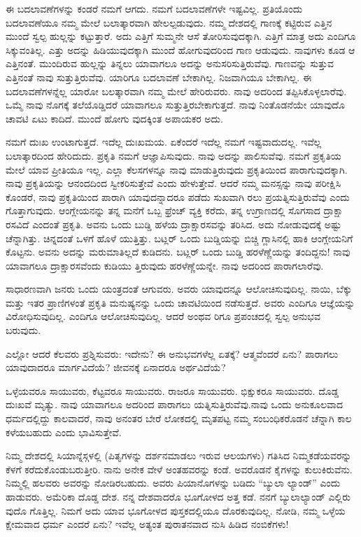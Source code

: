 ಈ ಬದಲಾವಣೆಗಳನ್ನು ಕಂಡರೆ ನಮಗೆ ಆಗದು. ನಮಗೆ ಬದಲಾವಣೆಗಳೇ ಇಷ್ಟವಿಲ್ಲ. ಪ್ರತಿಯೊಂದು ಬದಲಾವಣೆಯೂ ನಮ್ಮ ಮೇಲೆ ಬಲಾತ್ಕಾರವಾಗಿ ಹೇಲಲ್ಪಡುವುದು. ನಮ್ಮ ದೇಶದಲ್ಲಿ ಗಾಣಕ್ಕೆ ಕಟ್ಟಿರುವ ಎತ್ತಿನ ಮುಂದೆ ಸ್ವಲ್ಪ ಹುಲ್ಲನ್ನು ಕಟ್ಟುತ್ತಾರೆ. ಅದು ಎತ್ತಿಗೆ ಸುಮ್ಮನೇ ಆಸೆ ತೋರಿಸುವುದಕ್ಕಾಗಿ. ಎತ್ತಿಗೆ ಮಾತ್ರ ಅದು ಎಂದಿಗೂ ಸಿಕ್ಕುವಂತಿಲ್ಲ. ಎತ್ತು ಅದನ್ನು ಹಿಡಿಯುವುದಕ್ಕಾಗಿ ಮುಂದೆ ಹೋಗುವುದರಿಂದ ಗಾಣ ಆಡುವುದು. ನಾವುಗಳು ಕೂಡ ಆ ಎತ್ತಿನಂತೆ. ಮುಂದಿರುವ ಹುಲ್ಲನ್ನು ತಿನ್ನಲು ಯಾವಾಗಲೂ ಅದನ್ನು ಅನುಸರಿಸುತ್ತಿರುವೆವು. ಗಾಣವನ್ನು ಸುತ್ತುವ ಎತ್ತಿನಂತೆ ನಾವು ಸುತ್ತುತ್ತಿರುವೆವು. ಯಾರಿಗೂ ಬದಲಾವಣೆ ಬೇಕಾಗಿಲ್ಲ. ನಿಜವಾಗಿಯೂ ಬೇಕಾಗಿಲ್ಲ. ಈ ಬದಲಾವಣೆಗಳನ್ನೆಲ್ಲ ಯಾರೋ ಬಲತ್ಕಾರವಾಗಿ ನಮ್ಮ ಮೇಲೆ ಹೇರಿರುವರು. ನಾವು ಅದರಿಂದ ತಪ್ಪಿಸಿಕೊಳ್ಳಲಾರೆವು. ಒಮ್ಮೆ ನಾವು ನೊಗಕ್ಕೆ ತಲೆಯೊಡ್ಡಿದರೆ ಯಾವಾಗಲೂ ಸುತ್ತುತ್ತಿರಬೇಕಾಗುತ್ತದೆ. ನಾವು ನಿಂತೊಡನೆಯೇ ಯಾವುದೊ ಚಾವಟಿ ಏಟು ಕಾದಿದೆ. ಮುಂದೆ ಹೋಗು ವುದಕ್ಕಿಂತ ಅಪಾಯಕರ ಅದು.

ನಮಗೆ ದುಃಖ ಉಂಟಾಗುತ್ತದೆ. ಇದೆಲ್ಲ ದುಃಖಮಯ. ಏಕೆಂದರೆ ಇದೆಲ್ಲ ನಮಗೆ ಇಷ್ಟವಾದುದಲ್ಲ. ಇವೆಲ್ಲ ಬಲಾತ್ಕಾರದಿಂದ ಹೇರಿದುದು. ಪ್ರಕೃತಿ ನಮಗೆ ಆಜ್ಞಾಪಿಸುವುದು. ನಾವು ಅದನ್ನು ಪಾಲಿಸುವೆವು. ನಮಗೆ ಪ್ರಕೃತಿಯ ಮೇಲೆ ಯಾವ ಪ್ರೀತಿಯೂ ಇಲ್ಲ. ಎಲ್ಲಾ ಕೆಲಸಗಳನ್ನೂ ನಾವು ಮಾಡುತ್ತಿರುವುದು ಪ್ರಕೃತಿಯಿಂದ ಪಾರಾಗುವುದಕ್ಕಾಗಿ. ನಾವು ಪ್ರಕೃತಿಯನ್ನು ಆನಂದದಿಂದ ಸ್ವೀಕರಿಸುತ್ತೇವೆ ಎಂದು ಹೇಳುತ್ತೇವೆ. ಆದರೆ ನಮ್ಮ ಮನಸ್ಸನ್ನು ನಾವು ಪರೀಕ್ಷಿಸಿ ಕೊಂಡರೆ, ನಾವು ಪ್ರಕೃತಿಯಿಂದ ಪಾರಾಗಿ ಯಾವುದನ್ನಾದರೂ ಪಡೆದು ಸುಖವಾಗಿ ರಲು ಪ್ರಯತ್ನಿಸುತ್ತಿರುವೆವು ಎಂದು ಗೊತ್ತಾಗುವುದು. ಆಂಗ್ಲೇಯನನ್ನು ತನ್ನ ಮನೆಗೆ ಒಬ್ಬ ಫ್ರೆಂಚ್​ ವ್ಯಕ್ತಿ ಕರೆದು, ತನ್ನ ಉಗ್ರಾಣದಲ್ಲಿ ಸೊಗಸಾದ ದ್ರಾಕ್ಷಾ ರಸವಿದೆ ಎಂದಂತೆ ಪ್ರಕೃತಿ. ಅವನು ಒಂದು ಬುಡ್ಡಿ ಹಳೆಯ ದ್ರಾಕ್ಷಾರಸವನ್ನು ತರಿಸಿದ. ಅದು ನೋಡುವುದಕ್ಕೆ ಅಷ್ಟು ಚೆನ್ನಾಗಿತ್ತು. ಚಿನ್ನದಂತೆ ಒಳಗೆ ಹೊಳೆ ಯುತ್ತಿತ್ತು. ಬಟ್ಲರ್​ ಒಂದು ಬುಡ್ಡಿಯನ್ನು ಬಿಚ್ಚಿ ಗ್ಲಾಸಿನಲ್ಲಿ ಹಾಕಿ ಆಂಗ್ಲೇಯನಿಗೆ ಕೊಟ್ಟನು. ಅವನು ಅದನ್ನು ಮರುಮಾತಿಲ್ಲದೆ ಕುಡಿದನು. ಬಟ್ಲರ್​ ಒಂದು ಬುಡ್ಡಿ ಹರಳೆಣ್ಣೆಯನ್ನು ತಂದಿದ್ದನು! ನಾವು ಯಾವಾಗಲೂ ದ್ರಾಕ್ಷಾರಸವೆಂದು ಕುಡಿಯು ತ್ತಿರುವುದು ಹರಳೆಣ್ಣೆಯನ್ನೇ. ನಾವು ಅದರಿಂದ ಪಾರಾಗಲಾರೆವು.

ಸಾಧಾರಣವಾಗಿ ಜನರು ಒಂದು ಯಂತ್ರದಂತೆ ಆಗುವರು. ಅವರು ಯಾವುದನ್ನೂ ಆಲೋಚಿಸುವುದಿಲ್ಲ. ನಾಯಿ, ಬೆಕ್ಕು ಮತ್ತು ಇತರ ಪ್ರಾಣಿಗಳಂತೆ ಪ್ರಕೃತಿ ಮನುಷ್ಯನನ್ನು ಒಂದು ಚಾವಟಿಯಿಂದ ನಡೆಸುತ್ತದೆ. ಅವರು ಎಂದಿಗೂ ಆಜ್ಞೆಯನ್ನು ವಿರೋಧಿಸುವುದಿಲ್ಲ. ಎಂದಿಗೂ ಆಲೋಚಿಸುವುದಿಲ್ಲ. ಆದರೆ ಅಂಥವ ರಿಗೂ ಪ್ರಪಂಚದಲ್ಲಿ ಸ್ವಲ್ಪ ಅನುಭವ ಬರುವುದು.

ಎಲ್ಲೋ ಆದರೆ ಕೆಲವರು ಪ್ರಶ್ನಿಸುವರು: ಇದೇನು? ಈ ಅನುಭವಗಳೆಲ್ಲ ಏತಕ್ಕೆ? ಆತ್ಮವೆಂದರೆ ಏನು? ಪಾರಾಗಲು ಯಾವುದಾದರೂ ಮಾರ್ಗವಿದೆಯೆ? ಜೀವನಕ್ಕೆ ಏನಾದರೂ ಅರ್ಥವಿದೆಯೆ?

ಒಳ್ಳೆಯವರೂ ಸಾಯುವರು, ಕೆಟ್ಟವರೂ ಸಾಯುವರು. ರಾಜರೂ ಸಾಯುವರು. ಭಿಕ್ಷುಕರೂ ಸಾಯುವರು. ದೊಡ್ಡ ದುಃಖವೆ ಮೃತ್ಯು. ನಾವು ಯಾವಾಗಲೂ ಅದರಿಂದ ಪಾರಾಗಲು ಯತ್ನಿಸುತ್ತಿರುವೆವು.ನಾವು ಒಂದು ಅನುಕೂಲವಾದ ಧರ್ಮದಲ್ಲಿದ್ದು ಕಾಲವಾದರೆ, ನಾವು ಅನಂತರ ಬೇರೆ ಲೋಕದಲ್ಲಿ ಮೃತಪಟ್ಟ ನಮ್ಮ ಸಂಬಂಧಿಕರೊಡನೆ ಚೆನ್ನಾಗಿ ಕಾಲ ಕಳೆಯಬಹುದು ಎಂದು ಭಾವಿಸುತ್ತೇವೆ.

ನಿಮ್ಮ ದೇಶದಲ್ಲಿ ಸಿಯಾನ್ನೆಸ್ಗಳಲ್ಲಿ (ಪಿತೃಗಳನ್ನು ದರ್ಶನಮಾಡಲು ಇರುವ ಆಲಯಗಳು) ಗತಿಸಿದ ನಿಮ್ಮಕಡೆಯವರನ್ನು ಕೆಳಗೆ ಕರೆದುಕೊಂಡುಬರುತ್ತೀರಿ. ನಾನು ಅನೇಕ ವೇಳೆ ಅಂತಹವರನ್ನು ಕಂಡೆ. ಅವರೊಡನೆ ಕೈಗಳನ್ನು ಕುಲುಕಿರುವೆನು. ನಿಮ್ಮಲ್ಲಿ ಹಲವರು ಅವರನ್ನು ನೋಡಿರಬಹುದು. ಅವರು ಪಿಯಾನೊಗಳನ್ನು ಬಡಿದು “ಬ್ಯುಲಾ ಲ್ಯಾಂಡ್​” ಎಂದು ಹಾಡುವರು. ಅಮೆರಿಕಾ ದೊಡ್ಡ ದೇಶ. ನನ್ನ ದೇಶವಾದರೊ ಭೂಗೋಳದ ಅತ್ತ ಕಡೆ. ನನಗೆ ಬ್ಯುಲಾಲ್ಯಾಂಡ್​ ಎಲ್ಲಿರು ವುದೊ ಗೊತ್ತಿಲ್ಲ. ನಿಮಗೆ ಅದು ಯಾವ ಭೂಗೋಳದ ಪುಸ್ತಕದಲ್ಲಿಯೂ ದೊರಕುವುದಿಲ್ಲ. ನೋಡಿ, ನಮ್ಮ ಒಳ್ಳೆಯ ಕ್ಷೇಮವಾದ ಧರ್ಮ ಎಂದರೆ ಏನು? ಇವೆಲ್ಲ ಅತ್ಯಂತ ಪುರಾತನವಾದ ನುಸಿ ಹಿಡಿದ ನಂಬಿಕೆಗಳು!

